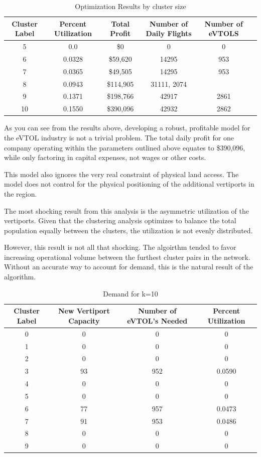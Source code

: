 \documentclass{article}
\begin{document}
\begin{table}[h!]
\centering
\caption{Optimization Results by cluster size}
\begin{tabular}{|c c c c c c|} 
 \hline
Cluster Label& Percent Utilization & Total Profit & Number of Daily Flights & Number of eVTOLS \\ [0.5ex] 
 \hline\hline
	5	& 0.0 & \$0	&  0 & 0 \\
	6&	0.0328&	\$59,620&		14295 & 953\\
	7&	0.0365&	\$49,505&		14295 & 953\\
	8&	0.0943&	\$114,905&		31111, 2074\\
	9&	0.1371&	\$198,766&		42917 & 2861\\
	10&	0.1550&	\$390,096&		42932 & 2862\\ [1ex] 
 \hline
\end{tabular}
\label{table:proj02}
\end{table}


As you can see from the results above, developing a robust, profitable model for the eVTOL industry is not a trivial problem. The total daily profit for one company operating within the parameters outlined above equates to \$390,096, while only factoring in capital expenses, not wages or other costs. 

This model also ignores the very real constraint of physical land access. The model does not control for the physical positioning of the additional vertiports in the region.

The most shocking result from this analysis is the asymmetric utilization of the vertiports. Given that the clustering analysis optimizes to balance the total population equally between the clusters, the utilization is not evenly distributed.

However, this result is not all that shocking. The algoirthm tended to favor increasing operational volume between the furthest cluster pairs in the network. Without an accurate way to account for demand, this is the natural result of the algorithm.

\begin{table}[h!]
\centering
\caption{Demand for k=10}
\begin{tabular}{|c c c c|} 
 \hline
Cluster Label& New Vertiport Capacity& Number of eVTOL's Needed& Percent Utilization  \\ [0.5ex] 
 \hline\hline
0&0 & 0 & 0\\ 
1&0 & 0 & 0\\
2&0 & 0 & 0\\
3&93 & 952 & 0.0590\\
4&0 & 0 & 0\\
5&0 & 0 & 0\\
6&77 & 957 & 0.0473\\
7&91 & 953 & 0.0486\\
8&0 & 0 & 0\\
9&0 & 0 & 0\\[1ex] 
 \hline
\end{tabular}
\label{table:proj02}
\end{table}
\end{document}
